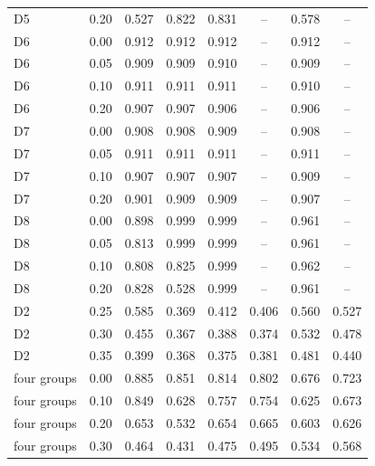 \begin{table}[htbp]
\begin{tabular}{llcccccc}
D5 & 0.20 & 0.527 & 0.822 & 0.831 & -- & 0.578 & -- \\
D6 & 0.00 & 0.912 & 0.912 & 0.912 & -- & 0.912 & -- \\
D6 & 0.05 & 0.909 & 0.909 & 0.910 & -- & 0.909 & -- \\
D6 & 0.10 & 0.911 & 0.911 & 0.911 & -- & 0.910 & -- \\
D6 & 0.20 & 0.907 & 0.907 & 0.906 & -- & 0.906 & -- \\
D7 & 0.00 & 0.908 & 0.908 & 0.909 & -- & 0.908 & -- \\
D7 & 0.05 & 0.911 & 0.911 & 0.911 & -- & 0.911 & -- \\
D7 & 0.10 & 0.907 & 0.907 & 0.907 & -- & 0.909 & -- \\
D7 & 0.20 & 0.901 & 0.909 & 0.909 & -- & 0.907 & -- \\
D8 & 0.00 & 0.898 & 0.999 & 0.999 & -- & 0.961 & -- \\
D8 & 0.05 & 0.813 & 0.999 & 0.999 & -- & 0.961 & -- \\
D8 & 0.10 & 0.808 & 0.825 & 0.999 & -- & 0.962 & -- \\
D8 & 0.20 & 0.828 & 0.528 & 0.999 & -- & 0.961 & -- \\
D2 & 0.25 & 0.585 & 0.369 & 0.412 & 0.406 & 0.560 & 0.527 \\
D2 & 0.30 & 0.455 & 0.367 & 0.388 & 0.374 & 0.532 & 0.478 \\
D2 & 0.35 & 0.399 & 0.368 & 0.375 & 0.381 & 0.481 & 0.440 \\
four groups & 0.00 & 0.885 & 0.851 & 0.814 & 0.802 & 0.676 & 0.723 \\
four groups & 0.10 & 0.849 & 0.628 & 0.757 & 0.754 & 0.625 & 0.673 \\
four groups & 0.20 & 0.653 & 0.532 & 0.654 & 0.665 & 0.603 & 0.626 \\
four groups & 0.30 & 0.464 & 0.431 & 0.475 & 0.495 & 0.534 & 0.568 \\
\bottomrule
\end{tabular}
\end{table}